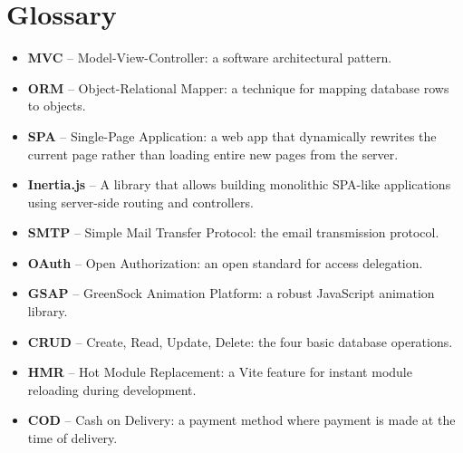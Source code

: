 \section{Glossary}
\begin{itemize}
    \item \textbf{MVC} -- Model-View-Controller: a software architectural pattern.
    \item \textbf{ORM} -- Object-Relational Mapper: a technique for mapping database rows to objects.
    \item \textbf{SPA} -- Single-Page Application: a web app that dynamically rewrites the current page rather than loading entire new pages from the server.
    \item \textbf{Inertia.js} -- A library that allows building monolithic SPA-like applications using server-side routing and controllers.
    \item \textbf{SMTP} -- Simple Mail Transfer Protocol: the email transmission protocol.
    \item \textbf{OAuth} -- Open Authorization: an open standard for access delegation.
    \item \textbf{GSAP} -- GreenSock Animation Platform: a robust JavaScript animation library.
    \item \textbf{CRUD} -- Create, Read, Update, Delete: the four basic database operations.
    \item \textbf{HMR} -- Hot Module Replacement: a Vite feature for instant module reloading during development.
    \item \textbf{COD} -- Cash on Delivery: a payment method where payment is made at the time of delivery.
\end{itemize}
